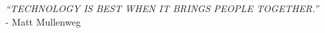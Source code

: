\clearpage
{}%

\begin{Center}
	\centering \MakeUppercase {\textit{``Technology is best when it brings people together.''}}\\
	- Matt Mullenweg 
\end{Center}
 
\clearpage
